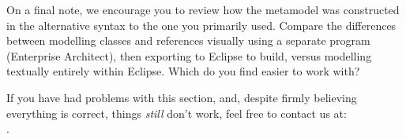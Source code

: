 On a final note, we encourage you to review how the metamodel was constructed in the alternative syntax to the one you primarily used. Compare the
differences between modelling classes and references visually using a separate program (Enterprise Architect), then exporting to Eclipse to build, versus
modelling textually entirely within Eclipse. Which do you find easier to work with?

If you have had problems with this section, and, despite firmly believing everything is correct, things \emph{still} don't work, feel free to contact us at:\\ 
\eMoflonContact.

